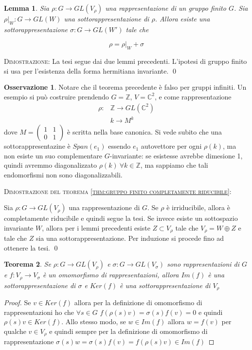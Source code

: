 \documentclass[11pt]{article}
\theoremstyle{plain}
\newtheorem{thm}{Teorema}[section]
\newtheorem{lemma}[thm]{Lemma}
\theoremstyle{definition}
\newtheorem*{rem}{Osservazione}
\theoremstyle{remark}
\newcommand{\C}{\mathbb{C}}
\newcommand{\Z}{\mathbb{Z}}
\begin{document}
\begin{lemma}
Sia $\rho: G \to GL(V_\rho)$ una rappresentazione di un gruppo finito $G$. Sia $\rho|_W: G \to GL(W)$ una sottorappresentazione di $\rho$. Allora esiste una sottorappresentazione $\sigma: G \to GL(W')$ tale che

\[\rho = \rho|_W + \sigma \]
\end{lemma}


\textsc{Dimostrazione:} La tesi segue dai due lemmi precedenti. L'ipotesi di gruppo finito si usa per l'esistenza della forma hermitiana invariante. \qed



\begin{rem} Notare che il teorema precedente è falso per gruppi infiniti. Un esempio si può costruire prendendo $G=\Z$, $V=\C^2$, e come rappresentazione
\begin{align*}
	\rho:&\Z\to GL(\C^2)\\
	&k\to M^k
\end{align*}
dove $M=\begin{pmatrix}
        	1 & 1\\
        	0 & 1
        \end{pmatrix}$ è scritta nella base canonica.\newline
Si vede subito che una sottorappresentazine è $Span(e_1)$ essendo $e_1$ autovettore per ogni $\rho(k)$, ma non esiste un suo complementare $G$-invariante: se esistesse avrebbe dimesione 1, quindi avremmo diagonalizzato $\rho(k)\ \forall k\in \Z$, ma sappiamo che tali endomorfismi non sono diagonalizzabili. 
\end{rem}


\textsc{Dimostrazione del teorema \ref{thm:gruppo finito completamente riducibile}:}

Sia $\rho: G \to GL(V_\rho)$ una rappresentazione di $G$. Se $\rho$ è irriducibile, allora è completamente riducibile e quindi segue la tesi. Se invece esiste un sottospazio invariante $W$, allora per i lemmi precedenti esiste $Z \subset V_\rho$ tale che $V_\rho = W \oplus Z$ e tale che $Z$ sia una sottorappresentazione. Per induzione si procede fino ad ottenere la tesi. \qed





\begin{thm} Se $\rho: G \to GL(V_\rho)$ e $\sigma: G \to GL(V_\sigma)$ sono rappresentazioni di $G$ e $f: V_\rho \to V_\sigma$ è un omomorfismo di rappresentazioni, allora $Im(f)$ è una sottorappresentazione di $\sigma$ e $Ker(f)$ è una sottorappresentazione di $V_\rho$
\end{thm}
\begin{proof}
Se $v\in Ker(f)$ allora per la definizione di omomorfismo di rappresentazioni ho che $\forall s\in G$ $f(\rho(s)v)=\sigma(s)f(v)=0$ e quindi $\rho(s)v\in Ker(f)$. Allo stesso modo, se $w\in Im(f)$ allora $w=f(v)$ per qualche $v\in V_\rho$ e quindi sempre per la definizione di omomorfismo di rappresentazione $\sigma(s)w=\sigma(s)f(v)=f(\rho(s)v)\in Im(f)$
\end{proof}
\end{document}
